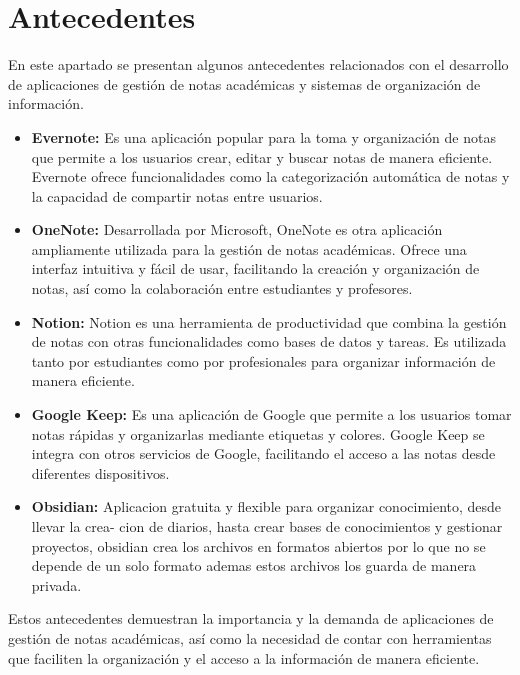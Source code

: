 \section{Antecedentes}
\noindent En este apartado se presentan algunos antecedentes relacionados con el desarrollo de aplicaciones de gestión de notas académicas y sistemas de organización de información.   
\begin{itemize}
    \item \textbf{Evernote:} Es una aplicación popular para la toma y organización de notas que permite a los usuarios crear, editar y buscar notas de manera eficiente. Evernote ofrece funcionalidades como la categorización automática de notas y la capacidad de compartir notas entre usuarios.\cite{evernote,espana_evernote_nodate}

    \item \textbf{OneNote:} Desarrollada por Microsoft, OneNote es otra aplicación ampliamente utilizada para la gestión de notas académicas. Ofrece una interfaz intuitiva y fácil de usar, facilitando la creación y organización de notas, así como la colaboración entre estudiantes y profesores.\cite{one_note}

    \item \textbf{Notion:} Notion es una herramienta de productividad que combina la gestión de notas con otras funcionalidades como bases de datos y tareas. Es utilizada tanto por estudiantes como por profesionales para organizar información de manera eficiente.\cite{Notion_2025,Notion_Personal}

    \item \textbf{Google Keep:} Es una aplicación de Google que permite a los usuarios tomar notas rápidas y organizarlas mediante etiquetas y colores. Google Keep se integra con otros servicios de Google, facilitando el acceso a las notas desde diferentes dispositivos.\cite{google_keep}
    
    \item \textbf{Obsidian:} Aplicacion gratuita y flexible para organizar conocimiento, desde llevar la crea-
    cion de diarios, hasta crear bases de conocimientos y gestionar proyectos, obsidian crea los archivos
    en formatos abiertos por lo que no se depende de un solo formato ademas estos archivos los guarda
    de manera privada.
    

\end{itemize}   

Estos antecedentes demuestran la importancia y la demanda de aplicaciones de gestión de notas académicas, así como la necesidad de contar con herramientas que faciliten la organización y el acceso a la información de manera eficiente.

